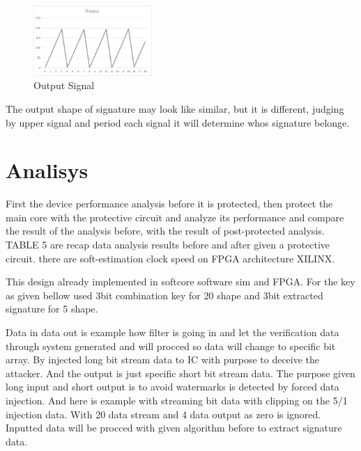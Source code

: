 \documentclass[10pt,journal,compsoc,letterpaper,final]{IEEEtran}
\begin{document}
\begin{figure}
	\centering
	\includegraphics[width=0.4\textwidth]
	{images/2.png}
	\caption{Output Signal}
	\label{outsig}
\end{figure}

The output shape of signature may look like similar, but it is different, judging by upper signal and period each signal it will determine whos signature belonge.



\section{Analisys}

First the device performance analysis before it is protected, then protect the main core with the protective circuit and analyze its performance and compare the result of the analysis before, with the result of post-protected analysis. TABLE 5 are recap data analysis results before and after given a protective circuit. there are soft-estimation clock speed on FPGA architecture XILINX.

This design already implemented in softcore software sim and FPGA. For the key as given bellow used 3bit combination key for 20 shape and 3bit extracted signature for 5 shape.

Data in data out is example how filter is going in and let the verification data through system generated and will procced so data will change to specific bit array. By injected long bit stream data to IC with purpose to deceive the attacker. And the output is just specific short bit stream data. The purpose given long input and short output is to avoid watermarks is detected by forced data injection. And here is example with streaming bit data with clipping on the 5/1 injection data. With 20 data stream and 4 data output as zero is ignored. Inputted data will be procced with given algorithm before to extract signature data.
\end{document}
